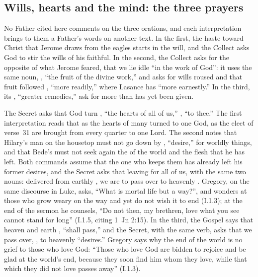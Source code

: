 \subsection{Wills, hearts and the mind: the three prayers}

No Father cited here comments on the three orations, and each interpretation
brings to them a Father's words on another text. In the first, the haste
toward Christ that Jerome draws from the eagles starts in the will, and the
Collect asks God to stir the wills of his faithful. In the second, the Collect
asks for the opposite of what Jerome feared, that we lie idle
``in the work of God'': it uses the same noun, ,
``the fruit of the divine work,'' and asks for wills roused and that fruit
followed , ``more readily,'' where Lasance has ``more
earnestly.'' In the third, its , ``greater remedies,''
ask for more than has yet been given.

The Secret asks that God turn , ``the hearts
of all of us,'' , ``to thee.'' The first interpretation reads that
as the hearts of many turned to one God, as the elect of verse~31 are brought
from every quarter to one Lord. The second notes that Hilary's man on the
housetop must not go down by , ``desire,'' for worldly
things, and that Bede's must not seek again the  of the
world and the flesh that he has left. Both commands assume that the one who
keeps them has already left his former desires, and the Secret asks that
leaving for all of us, with the same two nouns: delivered from earthly
, we are to pass over to heavenly .
Gregory, on the same discourse in Luke, asks, ``What is mortal life but a
way?'', and wonders at those who grow weary on the way and yet do not wish it
to end (I.1.3); at the end of the sermon he counsels, ``Do not then, my
brethren, love what you see cannot stand for long'' (I.1.5, citing 1~Jn 2:15).
In the third, the Gospel says that heaven and earth ,
``shall pass,'' and the Secret, with the same verb, asks that we pass over,
, to heavenly ``desires.'' Gregory says why the end of the world is no
grief to those who love God: ``Those who love God are bidden to rejoice and
be glad at the world's end, because they soon find him whom they love, while
that which they did not love passes away'' (I.1.3).

